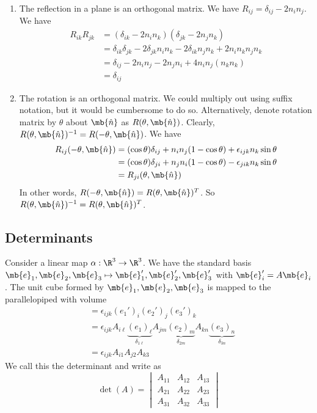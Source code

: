 \documentclass[a4paper]{article}
\begin{document}
\begin{eg}\leavevmode
  \begin{enumerate}
  \item The reflection in a plane is an orthogonal matrix. We have $R_{ij} = \delta_{ij} - 2n_in_j$. We have
    \begin{align*}
      R_{ik}R_{jk} &= (\delta_{ik} - 2n_in_k)(\delta_{jk} - 2n_jn_k)\\
      &= \delta_{ik}\delta_{jk} - 2\delta_{jk}n_in_k - 2\delta_{ik}n_jn_k + 2n_in_kn_jn_k\\
      &= \delta_{ij} - 2n_in_j - 2n_jn_i + 4n_in_j(n_kn_k)\\
      &= \delta_{ij}
    \end{align*}
  \item The rotation is an orthogonal matrix. We could multiply out using suffix notation, but it would be cumbersome to do so. Alternatively, denote rotation matrix by $\theta$ about $\mb{\hat n}$ as $R(\theta, \mb{\hat n})$. Clearly, $R(\theta, \mb{\hat n})^{-1} = R(-\theta, \mb{\hat n})$. We have
    \begin{align*}
      R_{ij}(-\theta, \mb{\hat n}) &= (\cos\theta)\delta_{ij} + n_in_j(1 - \cos\theta) + \epsilon_{ijk}n_k\sin\theta\\
      &= (\cos\theta)\delta_{ji} + n_jn_i(1 - \cos\theta) - \epsilon_{jik}n_k\sin\theta\\
      &= R_{ji}(\theta, \mb{\hat n})
    \end{align*}
    In other words, $R(-\theta, \mb{\hat n}) = R(\theta, \mb{\hat n})^T$. So $R(\theta, \mb{\hat n})^{-1} = R(\theta, \mb{\hat n})^T$.
  \end{enumerate}
\end{eg}

\subsection{Determinants}

Consider a linear map $\alpha: \R^3\to \R^3$. We have the standard basis $\mb{e}_1, \mb{e}_2, \mb{e}_3\mapsto \mb{e}_1', \mb{e}_2', \mb{e}_3'$ with $\mb{e}_i' = A\mb{e}_i$. The unit cube formed by $\mb{e}_1, \mb{e}_2, \mb{e}_3$ is mapped to the parallelopiped with volume
\begin{align*}
  [\mb{e}_1', \mb{e}_2', \mb{e}_3'] &= \epsilon_{ijk}(e_1')_i (e_2')_j (e_3')_k\\
  &= \epsilon_{ijk} A_{i\ell} \underbrace{(e_1)_\ell}_{\delta_{1\ell}} A_{jm}\underbrace{(e_2)_m}_{\delta_{2m}} A_{kn}\underbrace{(e_3)_n}_{\delta_{3n}}\\
  &= \epsilon_{ijk} A_{i1}A_{j2}A_{k3}
\end{align*}
We call this the determinant and write as
\[
\det(A) = \begin{vmatrix} A_{11} & A_{12} & A_{13}\\A_{21} & A_{22} & A_{23} \\ A_{31} & A_{32} & A_{33}\end{vmatrix}
\]
\end{document}
